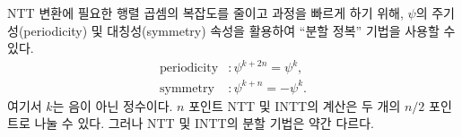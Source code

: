 NTT 변환에 필요한 행렬 곱셈의 복잡도를 줄이고 과정을 빠르게 하기 위해, $\psi$의 주기성(periodicity) 및 대칭성(symmetry) 속성을 활용하여 ``분할 정복'' 기법을 사용할 수 있다.
\begin{align*}
\text{periodicity} &: \psi^{k+2n} = \psi^k, \\
\text{symmetry} &: \psi^{k+n} = -\psi^k.
\end{align*}
여기서 $k$는 음이 아닌 정수이다. $n$ 포인트 NTT 및 INTT의 계산은 두 개의 $n/2$ 포인트로 나눌 수 있다. 그러나 NTT 및 INTT의 분할 기법은 약간 다르다.